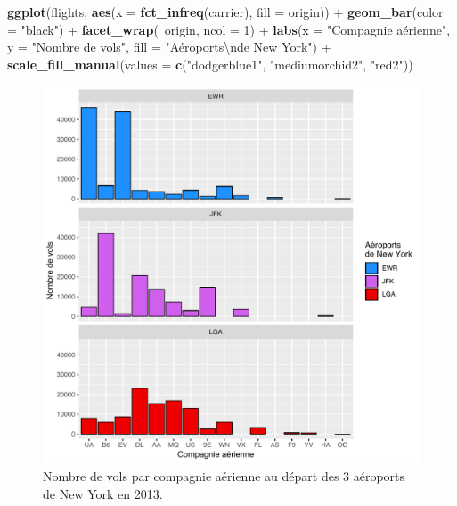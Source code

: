 \documentclass[
  a4paper,
]{article}
\newenvironment{Shaded}{\begin{snugshade}}{\end{snugshade}}
\newcommand{\CharTok}[1]{\textcolor[rgb]{0.57,0.30,0.62}{#1}}
\newcommand{\DataTypeTok}[1]{\textcolor[rgb]{0.00,0.34,0.68}{#1}}
\newcommand{\DecValTok}[1]{\textcolor[rgb]{0.69,0.50,0.00}{#1}}
\newcommand{\KeywordTok}[1]{\textcolor[rgb]{0.12,0.11,0.11}{\textbf{#1}}}
\newcommand{\NormalTok}[1]{\textcolor[rgb]{0.12,0.11,0.11}{#1}}
\newcommand{\OperatorTok}[1]{\textcolor[rgb]{0.12,0.11,0.11}{#1}}
\newcommand{\StringTok}[1]{\textcolor[rgb]{0.75,0.01,0.01}{#1}}
\begin{document}
\begin{Shaded}
\begin{Highlighting}[]
\KeywordTok{ggplot}\NormalTok{(flights, }\KeywordTok{aes}\NormalTok{(}\DataTypeTok{x =} \KeywordTok{fct_infreq}\NormalTok{(carrier), }\DataTypeTok{fill =}\NormalTok{ origin)) }\OperatorTok{+}
\StringTok{  }\KeywordTok{geom_bar}\NormalTok{(}\DataTypeTok{color =} \StringTok{"black"}\NormalTok{) }\OperatorTok{+}
\StringTok{  }\KeywordTok{facet_wrap}\NormalTok{(}\OperatorTok{~}\NormalTok{origin, }\DataTypeTok{ncol =} \DecValTok{1}\NormalTok{) }\OperatorTok{+}
\StringTok{  }\KeywordTok{labs}\NormalTok{(}\DataTypeTok{x =} \StringTok{"Compagnie aérienne"}\NormalTok{,}
       \DataTypeTok{y =} \StringTok{"Nombre de vols"}\NormalTok{,}
       \DataTypeTok{fill =} \StringTok{"Aéroports}\CharTok{\textbackslash{}n}\StringTok{de New York"}\NormalTok{) }\OperatorTok{+}
\StringTok{  }\KeywordTok{scale_fill_manual}\NormalTok{(}\DataTypeTok{values =} \KeywordTok{c}\NormalTok{(}\StringTok{"dodgerblue1"}\NormalTok{, }\StringTok{"mediumorchid2"}\NormalTok{, }\StringTok{"red2"}\NormalTok{))}
\end{Highlighting}
\end{Shaded}

\begin{figure}[htpb]

{\centering \includegraphics[width=0.9\linewidth]{figure/barfacetmanual-1} 

}

\caption{Nombre de vols par compagnie aérienne au départ des 3 aéroports de New York en 2013.}\label{fig:barfacetmanual}
\end{figure}
\end{document}
